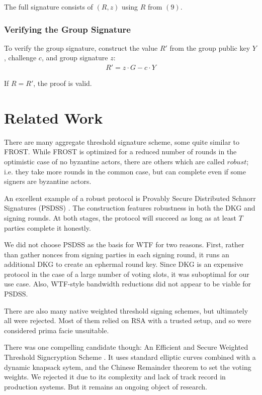 \documentclass{article}
\begin{document}
The full signature consists of $(R, z)$ using $R$ from $(9)$.

\subsubsection{
  Verifying the Group Signature
}

To verify the group signature, construct the value $R'$ from the group public key $Y$, challenge $c$, and group signature $z$:
\begin{align}
  R' = z \cdot G - c \cdot Y
\end{align}

If $R = R'$, the proof is valid.

\newpage
\onecolumn
\section{
  Related Work
}

There are many aggregate threshold signature scheme, some quite similar to FROST.  While FROST is optimized for a reduced number of rounds in the optimistic case of no byzantine actors, there are others which are called $robust$; i.e. they take more rounds in the common case, but can complete even if some signers are byzantine actors.

An excellent example of a robust protocol is Provably Secure Distributed Schnorr Signatures (PSDSS) \cite{psdss}.  The construction features robustness in both the DKG and signing rounds.  At both stages, the protocol will succeed as long as at least $T$ parties complete it honestly.

We did not choose PSDSS as the basis for WTF for two reasons.  First, rather than gather nonces from signing parties in each signing round, it runs an additional DKG to create an ephermal round key.  Since DKG is an expensive protocol in the case of a large number of voting slots, it was suboptimal for our use case.  Also, WTF-style bandwidth reductions did not appear to be viable for PSDSS.

There are also many native weighted threshold signing schemes, but ultimately all were rejected.  Most of them relied on RSA with a trusted setup, and so were considered prima facie unsuitable.

There was one compelling candidate though: An Efficient and Secure Weighted Threshold Signcryption Scheme \cite{eswtss}.  It uses standard elliptic curves combined with a dynamic knapsack sytem, and the Chinese Remainder theorem to set the voting weights.  We rejected it due to its complexity and lack of track record in production systems.  But it remains an ongoing object of research.
\end{document}

